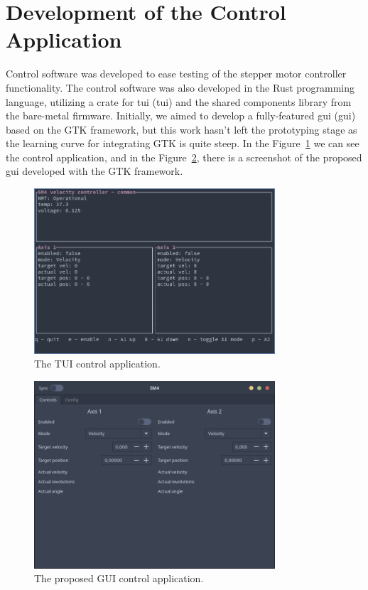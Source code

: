 \section{Development of the Control Application}
\label{sec:control_sw}
Control software was developed to ease testing of the stepper motor controller functionality.
The control software was also developed in the Rust programming language, utilizing a crate for \acs{tui} (\acl{tui}) and the shared components library from the bare-metal firmware.
Initially, we aimed to develop a fully-featured \acs{gui} (\acl{gui}) based on the GTK framework, but this work hasn't left the prototyping stage as the learning curve for integrating GTK is quite steep.
In the Figure~\ref{fig:tui} we can see the control application, and in the Figure~\ref{fig:gui}, there is a screenshot of the proposed \acs{gui} developed with the GTK framework.

\begin{figure}[H]
    \centering
    \includegraphics[width=0.8\textwidth]{obrazky/tui}
    \caption{The TUI control application.}
    \label{fig:tui}
\end{figure}

\begin{figure}[H]
    \centering
    \includegraphics[width=0.8\textwidth]{obrazky/gui}
    \caption{The proposed GUI control application.}
    \label{fig:gui}
\end{figure}


